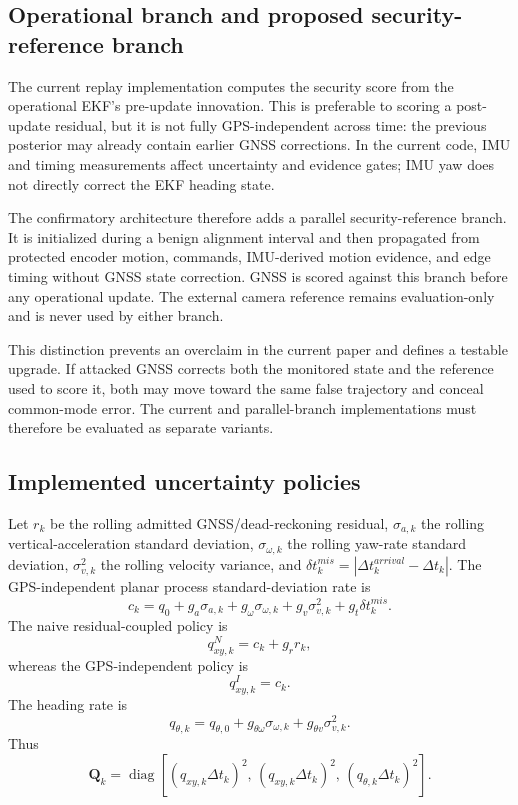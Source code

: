 \documentclass[11pt,a4paper]{article}
\newcommand{\diag}{\operatorname{diag}}
\begin{document}
\subsection{Operational branch and proposed security-reference branch}

The current replay implementation computes the security score from the
operational EKF's pre-update innovation. This is preferable to scoring a
post-update residual, but it is not fully GPS-independent across time: the
previous posterior may already contain earlier GNSS corrections. In the current
code, IMU and timing measurements affect uncertainty and evidence gates; IMU
yaw does not directly correct the EKF heading state.

The confirmatory architecture therefore adds a parallel security-reference
branch. It is initialized during a benign alignment interval and then
propagated from protected encoder motion, commands, IMU-derived motion
evidence, and edge timing without GNSS state correction. GNSS is scored against
this branch before any operational update. The external camera reference
remains evaluation-only and is never used by either branch.

This distinction prevents an overclaim in the current paper and defines a
testable upgrade. If attacked GNSS corrects both the monitored state and the
reference used to score it, both may move toward the same false trajectory and
conceal common-mode error. The current and parallel-branch implementations
must therefore be evaluated as separate variants.

\subsection{Implemented uncertainty policies}

Let $r_k$ be the rolling admitted GNSS/dead-reckoning residual,
$\sigma_{a,k}$ the rolling vertical-acceleration standard deviation,
$\sigma_{\omega,k}$ the rolling yaw-rate standard deviation,
$\sigma^2_{v,k}$ the rolling velocity variance, and
$\delta t_k^{mis}=|\Delta t_k^{arrival}-\Delta t_k|$.
The GPS-independent planar process standard-deviation rate is
\[
c_k=q_0+g_a\sigma_{a,k}+g_\omega\sigma_{\omega,k}
+g_v\sigma^2_{v,k}+g_t\delta t_k^{mis}.
\]
The naive residual-coupled policy is
\[
q_{xy,k}^{N}=c_k+g_r r_k,
\]
whereas the GPS-independent policy is
\[
q_{xy,k}^{I}=c_k.
\]
The heading rate is
\[
q_{\theta,k}=q_{\theta,0}
+g_{\theta\omega}\sigma_{\omega,k}
+g_{\theta v}\sigma^2_{v,k}.
\]
Thus
\[
\mathbf Q_k=
\diag\!\left[
(q_{xy,k}\Delta t_k)^2,\,
(q_{xy,k}\Delta t_k)^2,\,
(q_{\theta,k}\Delta t_k)^2
\right].
\]
\end{document}
